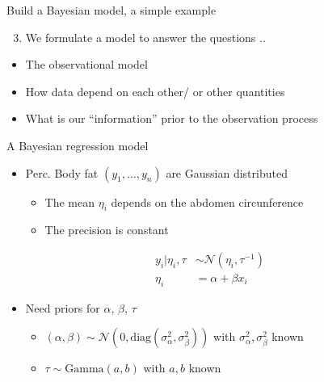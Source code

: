 \documentclass[
  ignorenonframetext,
]{beamer}
\providecommand{\tightlist}{%
  \setlength{\itemsep}{0pt}\setlength{\parskip}{0pt}}
\begin{document}
\begin{frame}{Build a Bayesian model, a simple example}
\protect\hypertarget{build-a-bayesian-model-a-simple-example-2}{}
\begin{enumerate}
\setcounter{enumi}{2}
\tightlist
\item
  We formulate a model to answer the questions ..
\end{enumerate}

\begin{itemize}
\tightlist
\item
  The observational model
\item
  How data depend on each other/ or other quantities
\item
  What is our ``information'' prior to the observation process
\end{itemize}
\end{frame}

\begin{frame}{A Bayesian regression model}
\protect\hypertarget{a-bayesian-regression-model}{}
\begin{itemize}
\tightlist
\item
  Perc. Body fat \((y_1, \dots, y_n)\) are Gaussian distributed

  \begin{itemize}
  \tightlist
  \item
    The mean \(\eta_i\) depends on the abdomen circunference
  \item
    The precision is constant
  \end{itemize}
\end{itemize}

\[
\begin{aligned}
  y_i|\eta_i,\tau &\sim \mathcal{N}(\eta_i,\tau^{-1})\\
  \eta_i & =  \alpha + \beta x_i
\end{aligned}
\]

\begin{itemize}
\item
  Need priors for \(\alpha\), \(\beta\), \(\tau\)

  \begin{itemize}
  \item
    \((\alpha, \beta)\sim\mathcal{N}(0, \text{diag}(\sigma^2_{\alpha}, \sigma^2_{\beta}))\)
    with \(\sigma^2_{\alpha}, \sigma^2_{\beta}\) known
  \item
    \(\tau\sim\text{Gamma}(a,b)\) with \(a,b\) known
  \end{itemize}
\end{itemize}
\end{frame}
\end{document}
